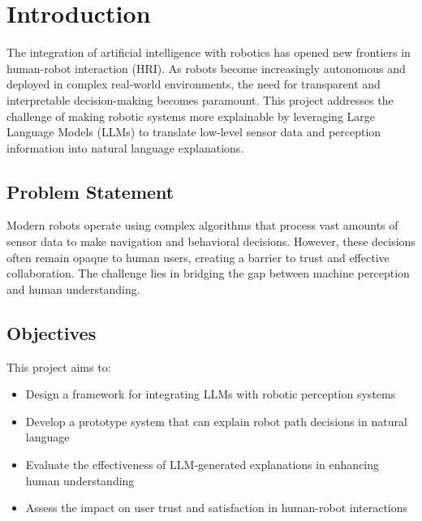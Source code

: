 \section{Introduction}

The integration of artificial intelligence with robotics has opened new frontiers in human-robot interaction (HRI). As robots become increasingly autonomous and deployed in complex real-world environments, the need for transparent and interpretable decision-making becomes paramount.
This project addresses the challenge of making robotic systems more explainable by leveraging Large Language Models (LLMs) to translate low-level sensor data and perception information into natural language explanations.

\subsection{Problem Statement}

Modern robots operate using complex algorithms that process vast amounts of sensor data to make navigation and behavioral decisions.
However, these decisions often remain opaque to human users, creating a barrier to trust and effective collaboration.
The challenge lies in bridging the gap between machine perception and human understanding.

\subsection{Objectives}

This project aims to:
\begin{itemize}
    \item Design a framework for integrating LLMs with robotic perception systems
    \item Develop a prototype system that can explain robot path decisions in natural language
    \item Evaluate the effectiveness of LLM-generated explanations in enhancing human understanding
    \item Assess the impact on user trust and satisfaction in human-robot interactions
\end{itemize}
